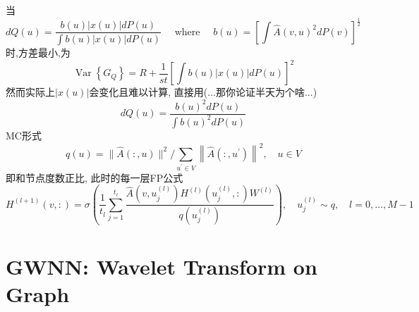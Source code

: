 \documentclass{article}
\begin{document}
     当
    \begin{equation}
        d Q(u)=\frac{b(u)|x(u)| d P(u)}{\int b(u)|x(u)| d P(u)} \quad \text { where } \quad b(u)=\left[\int \hat{A}(v, u)^{2} d P(v)\right]^{\frac{1}{2}}
    \end{equation}
    时,方差最小,为
    \begin{equation}
        \operatorname{Var}\left\{G_{Q}\right\}=R+\frac{1}{s t}\left[\int b(u)|x(u)| d P(u)\right]^{2}
    \end{equation}
    然而实际上$|x(u)|$会变化且难以计算, 直接用(...那你论证半天为个啥...)
    \begin{equation}
        d Q(u)=\frac{b(u)^{2} d P(u)}{\int b(u)^{2} d P(u)}
    \end{equation}
    MC形式
    \begin{equation}
        q(u)=\|\hat{A}(:, u)\|^{2} / \sum_{u^{\prime} \in V}\left\|\hat{A}\left(:, u^{\prime}\right)\right\|^{2}, \quad u \in V
    \end{equation}
    即和节点度数正比, 此时的每一层FP公式
    \begin{equation}
        H^{(l+1)}(v,:)=\sigma\left(\frac{1}{t_{l}} \sum_{j=1}^{t_{l}} \frac{\hat{A}\left(v, u_{j}^{(l)}\right) H^{(l)}\left(u_{j}^{(l)},:\right) W^{(l)}}{q\left(u_{j}^{(l)}\right)}\right), \quad u_{j}^{(l)} \sim q, \quad l=0, \ldots, M-1
    \end{equation}


\section{GWNN: Wavelet Transform on Graph}
\end{document}
